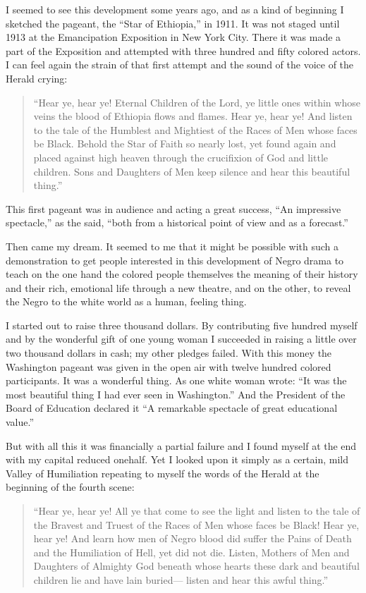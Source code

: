 \documentclass[letterpaper,10pt,english]{jupyterBook}
\begin{document}
\sphinxAtStartPar
I seemed to see this development some years ago, and as a kind of beginning I sketched the pageant, the “Star of Ethiopia,” in 1911. It was not staged until 1913 at the Emancipation Exposition in New York City. There it was made a part of the Exposition and attempted with three hundred and fifty colored actors. I can feel again the strain of that first attempt and the sound of the voice of the Herald crying:
\begin{quote}

\sphinxAtStartPar
“Hear ye, hear ye! Eternal Children of the Lord, ye little ones within whose veins the blood of Ethiopia flows and flames. Hear ye, hear ye! And listen to the tale of the Humblest and Mightiest of the Races of Men whose faces be Black. Behold the Star of Faith so nearly lost, yet found again and placed against high heaven through the crucifixion of God and little children. Sons and Daughters of Men keep silence and hear this beautiful thing.”
\end{quote}

\sphinxAtStartPar
This first pageant was in audience and acting a great success, “An impressive spectacle,” as the  said, “both from a historical point of view and as a forecast.”

\sphinxAtStartPar
Then came my dream. It seemed to me that it might be possible with such a demonstration to get people interested in this development of Negro drama to teach on the one hand the colored people themselves the meaning of their history and their rich, emotional life through a new theatre, and on the other, to reveal the Negro to the white world as a human, feeling thing.

\sphinxAtStartPar
I started out to raise three thousand dollars. By contributing five hundred myself and by the wonderful gift of one young woman I succeeded in raising a little over two thousand dollars in cash; my other pledges failed. With this money the Washington pageant was given in the open air with twelve hundred colored participants. It was a wonderful thing. As one white woman wrote: “It was the most beautiful thing I had ever seen in Washington.” And the President of the Board of Education declared it “A remarkable spectacle of great educational value.”

\sphinxAtStartPar
But with all this it was financially a partial failure and I found myself at the end with my capital reduced one\sphinxhyphen{}half. Yet I looked upon it simply as a certain, mild Valley of Humiliation repeating to myself the words of the Herald at the beginning of the fourth scene:
\begin{quote}

\sphinxAtStartPar
“Hear ye, hear ye! All ye that come to see the light and listen to the tale of the Bravest and Truest of the Races of Men whose faces be Black! Hear ye, hear ye! And learn how men of Negro blood did suffer the Pains of Death and the Humiliation of Hell, yet did not die. Listen, Mothers of Men and Daughters of Almighty God beneath whose hearts these dark and beautiful children lie and have lain buried— listen and hear this awful thing.”
\end{quote}
\end{document}
